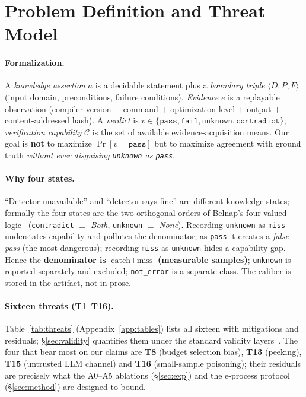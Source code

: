 \documentclass{article}
\begin{document}
\section{Problem Definition and Threat Model}
\label{sec:threat}
\paragraph{Formalization.}
A \emph{knowledge assertion} $a$ is a decidable statement plus a \emph{boundary triple}
$\langle D, P, F\rangle$ (input domain, preconditions, failure conditions). \emph{Evidence} $e$ is
a replayable observation (compiler version $+$ command $+$ optimization level $+$ output $+$
content-addressed hash). A \emph{verdict} is $v\in\{\texttt{pass},\texttt{fail},\texttt{unknown},
\texttt{contradict}\}$; \emph{verification capability} $\mathcal{C}$ is the set of available
evidence-acquisition means. Our goal is \textbf{not} to maximize $\Pr[v{=}\texttt{pass}]$ but to
maximize agreement with ground truth \emph{without ever disguising \texttt{unknown} as \texttt{pass}}.

\paragraph{Why four states.} ``Detector unavailable'' and ``detector says fine'' are different
knowledge states; formally the four states are the two orthogonal orders of Belnap's four-valued
logic~\cite{belnap1977useful} (\texttt{contradict} $\equiv$ \emph{Both}, \texttt{unknown}
$\equiv$ \emph{None}). Recording \texttt{unknown} as \texttt{miss} understates capability and pollutes
the denominator; as \texttt{pass} it creates a \emph{false pass} (the most dangerous); recording
\texttt{miss} as \texttt{unknown} hides a capability gap. Hence the \textbf{denominator is
$\text{catch}+\text{miss}$ (measurable samples)}; \texttt{unknown} is reported separately and
excluded; \texttt{not\_error} is a separate class. The caliber is stored in the artifact, not in
prose.

\paragraph{Sixteen threats (T1--T16).}
Table~\ref{tab:threats} (Appendix~\ref{app:tables}) lists all sixteen with mitigations and
residuals; \S\ref{sec:validity} quantifies them under the standard validity
layers~\cite{shadish2002experimental}. The four that bear most on our claims are \textbf{T8}
(budget selection bias), \textbf{T13} (peeking), \textbf{T15} (untrusted LLM channel) and
\textbf{T16} (small-sample poisoning); their residuals are precisely what the A0--A5 ablations
(\S\ref{sec:exp}) and the e-process protocol (\S\ref{sec:method}) are designed to bound.
\end{document}
